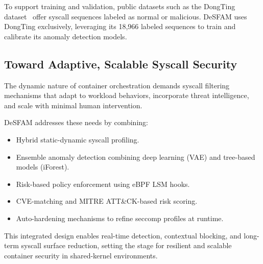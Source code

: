 To support training and validation, public datasets such as the DongTing
dataset~\cite{ref26_dongtingdataset} offer syscall sequences labeled as normal or malicious.
DeSFAM uses DongTing exclusively, leveraging its 18,966 labeled sequences to train and calibrate
its anomaly detection models.

\subsection{Toward Adaptive, Scalable Syscall Security}
\label{subsec:adaptive_security}

The dynamic nature of container orchestration demands syscall filtering mechanisms that adapt to
workload behaviors, incorporate threat intelligence, and scale with minimal human intervention.

DeSFAM addresses these needs by combining:
\begin{itemize}
  \item Hybrid static-dynamic syscall profiling.
  \item Ensemble anomaly detection combining deep learning (VAE) and tree-based models (iForest).
  \item Risk-based policy enforcement using eBPF LSM hooks.
  \item CVE-matching and MITRE ATT\&CK-based risk scoring.
  \item Auto-hardening mechanisms to refine seccomp profiles at runtime.
\end{itemize}

This integrated design enables real-time detection, contextual blocking, and long-term syscall
surface reduction, setting the stage for resilient and scalable container security in
shared-kernel environments.
